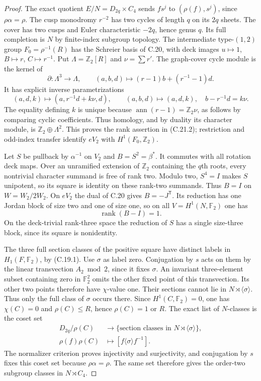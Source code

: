 \begin{proof}
The exact quotient $E/N=D_{2q}\times C_4$ sends
$fs^j$ to $(\rho(f),s^j)$, since $\rho\alpha=\rho$.
The cusp monodromy $r^{-2}$ has two cycles of length
$q$ on its $2q$ sheets.  The cover has two cusps and
Euler characteristic $-2q$, hence genus $q$.
Its full completion is $N$ by finite-index subgroup
topology.  The intermediate type-$(1,2)$ group
$F_0=\rho^{-1}(R)$ has the Schreier basis of C.20,
with deck images $u\mapsto1$, $B\mapsto r$,
$C\mapsto r^{-1}$.  Put $\Lambda=\mathbb Z_2[R]$
and $\nu=\sum r'$.  The graph-cover cycle module is
the kernel of
\[
 \partial:\Lambda^3\to\Lambda,\qquad
          (a,b,d)\mapsto(r-1)b+(r^{-1}-1)d.
\]
It has explicit inverse parametrizations
\[
 (a,d,k)\mapsto(a,r^{-1}d+k\nu,d),\qquad
 (a,b,d)\mapsto(a,d,k),\quad b-r^{-1}d=k\nu.
\]
The equality defining $k$ is unique because
$\operatorname{ann}(r-1)=\mathbb Z_2\nu$, as follows
by comparing cyclic coefficients.  Thus homology,
and by duality its character module, is
$\mathbb Z_2\oplus\Lambda^2$.  This proves the rank
assertion in (C.21.2); restriction and odd-index
transfer identify $eV_2$ with $H^1(F_0,\mathbb Z_2)$.

Let $S$ be pullback by $\alpha^{-1}$ on $V_2$ and
$B=S^2=\beta^*$.  It commutes with all rotation deck
maps.  Over an unramified extension of $\mathbb Z_2$
containing the $q$th roots, every nontrivial character
summand is free of rank two.  Modulo two, $S^4=I$
makes $S$ unipotent, so its square is identity on
these rank-two summands.  Thus $B=I$ on
$W=W_2/2W_2$.  On $eV_2$ the dual of C.20 gives
$B=-J^{\mathsf T}$.  Its reduction has one Jordan
block of size two and one of size one, so on all
$V=H^1(N,\mathbb F_2)$ one has
\[
                       \operatorname{rank}(B-I)=1.         \tag{C.21.3}
\]
On the deck-trivial rank-three space the reduction
of $S$ has a single size-three block, since its
square is nonidentity.

The three full section classes of the positive
square have distinct labels in $H_1(F,\mathbb F_2)$,
by (C.19.1).  Use $\sigma$ as label zero.
Conjugation by $s$ acts on them by the linear
transvection $A_2\bmod2$, since it fixes $\sigma$.
An invariant three-element subset containing zero
in $\mathbb F_2^2$ omits the other fixed point of
this transvection.  Its other two points therefore
have $\chi$-value one.  Their sections cannot lie
in $N\rtimes\langle\sigma\rangle$.  Thus only the
full class of $\sigma$ occurs there.  Since
$H^1(C,\mathbb F_2)=0$, one has $\chi(C)=0$ and
$\rho(C)\leq R$, hence $\rho(C)=1$ or $R$.
The exact list of $N$-classes is the coset set
\[
\begin{split}
 D_{2q}/\rho(C)&\longrightarrow
 \{\text{section classes in }N\rtimes\langle\sigma\rangle\},\\
 \rho(f)\rho(C)&\longmapsto[f\langle\sigma\rangle f^{-1}].
\end{split}                                                   \tag{C.21.4}
\]
The normalizer criterion proves injectivity and
surjectivity, and conjugation by $s$ fixes this
coset set because $\rho\alpha=\rho$.  The same
set therefore gives the order-two subgroup classes
in $N\rtimes C_4$.


\end{proof}
